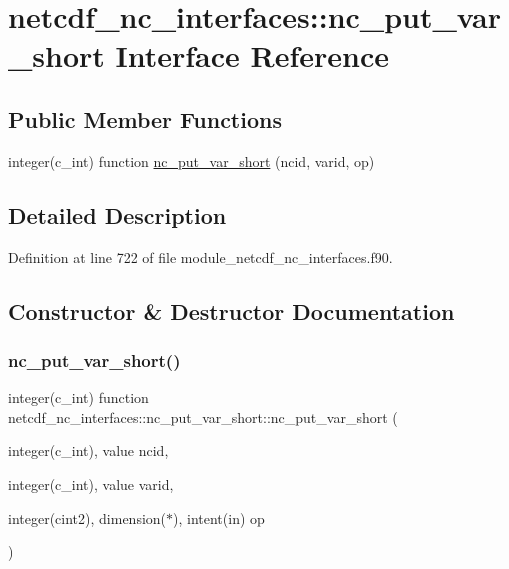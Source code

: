 \hypertarget{interfacenetcdf__nc__interfaces_1_1nc__put__var__short}{}\section{netcdf\+\_\+nc\+\_\+interfaces\+:\+:nc\+\_\+put\+\_\+var\+\_\+short Interface Reference}
\label{interfacenetcdf__nc__interfaces_1_1nc__put__var__short}
\subsection*{Public Member Functions}
\begin{DoxyCompactItemize}
\item 
integer(c\+\_\+int) function \hyperlink{interfacenetcdf__nc__interfaces_1_1nc__put__var__short_a6bc866ae0ed6071eeb2786f1ebdd15ae}{nc\+\_\+put\+\_\+var\+\_\+short} (ncid, varid, op)
\end{DoxyCompactItemize}


\subsection{Detailed Description}


Definition at line 722 of file module\+\_\+netcdf\+\_\+nc\+\_\+interfaces.\+f90.



\subsection{Constructor \& Destructor Documentation}
\mbox{\label{interfacenetcdf__nc__interfaces_1_1nc__put__var__short_a6bc866ae0ed6071eeb2786f1ebdd15ae}} 
\subsubsection{\texorpdfstring{nc\+\_\+put\+\_\+var\+\_\+short()}{nc\_put\_var\_short()}}
{\footnotesize\ttfamily integer(c\+\_\+int) function netcdf\+\_\+nc\+\_\+interfaces\+::nc\+\_\+put\+\_\+var\+\_\+short\+::nc\+\_\+put\+\_\+var\+\_\+short (\begin{DoxyParamCaption}\item[{integer(c\+\_\+int), value}]{ncid,  }\item[{integer(c\+\_\+int), value}]{varid,  }\item[{integer(cint2), dimension($\ast$), intent(in)}]{op }\end{DoxyParamCaption})}



